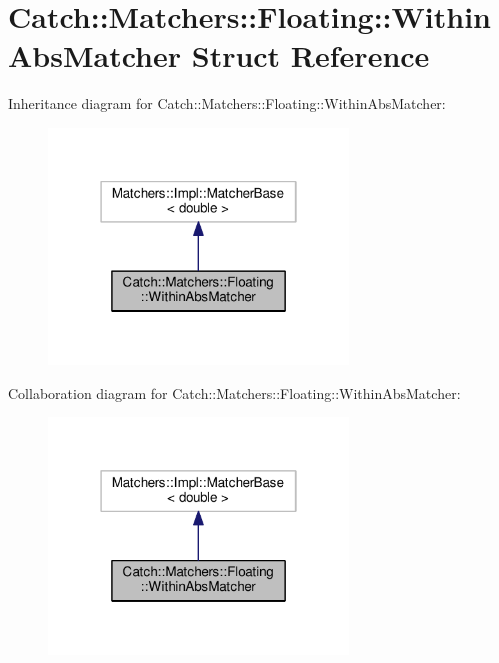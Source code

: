 \hypertarget{structCatch_1_1Matchers_1_1Floating_1_1WithinAbsMatcher}{}\section{Catch\+:\+:Matchers\+:\+:Floating\+:\+:Within\+Abs\+Matcher Struct Reference}
\label{structCatch_1_1Matchers_1_1Floating_1_1WithinAbsMatcher}


Inheritance diagram for Catch\+:\+:Matchers\+:\+:Floating\+:\+:Within\+Abs\+Matcher\+:\nopagebreak
\begin{figure}[H]
\begin{center}
\leavevmode
\includegraphics[width=226pt]{structCatch_1_1Matchers_1_1Floating_1_1WithinAbsMatcher__inherit__graph}
\end{center}
\end{figure}


Collaboration diagram for Catch\+:\+:Matchers\+:\+:Floating\+:\+:Within\+Abs\+Matcher\+:\nopagebreak
\begin{figure}[H]
\begin{center}
\leavevmode
\includegraphics[width=226pt]{structCatch_1_1Matchers_1_1Floating_1_1WithinAbsMatcher__coll__graph}
\end{center}
\end{figure}
